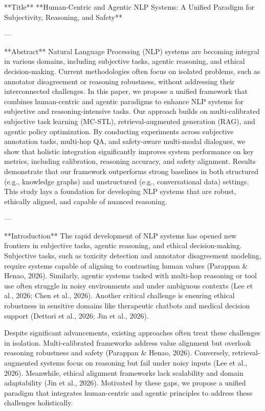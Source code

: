 **Title**  
**Human-Centric and Agentic NLP Systems: A Unified Paradigm for Subjectivity, Reasoning, and Safety**

---

**Abstract**  
Natural Language Processing (NLP) systems are becoming integral in various domains, including subjective tasks, agentic reasoning, and ethical decision-making. Current methodologies often focus on isolated problems, such as annotator disagreement or reasoning robustness, without addressing their interconnected challenges. In this paper, we propose a unified framework that combines human-centric and agentic paradigms to enhance NLP systems for subjective and reasoning-intensive tasks. Our approach builds on multi-calibrated subjective task learning (MC-STL), retrieval-augmented generation (RAG), and agentic policy optimization. By conducting experiments across subjective annotation tasks, multi-hop QA, and safety-aware multi-modal dialogues, we show that holistic integration significantly improves system performance on key metrics, including calibration, reasoning accuracy, and safety alignment. Results demonstrate that our framework outperforms strong baselines in both structured (e.g., knowledge graphs) and unstructured (e.g., conversational data) settings. This study lays a foundation for developing NLP systems that are robust, ethically aligned, and capable of nuanced reasoning.

---

**Introduction**  
The rapid development of NLP systems has opened new frontiers in subjective tasks, agentic reasoning, and ethical decision-making. Subjective tasks, such as toxicity detection and annotator disagreement modeling, require systems capable of aligning to contrasting human values (Parappan & Henao, 2026). Similarly, agentic systems tasked with multi-hop reasoning or tool use often struggle in noisy environments and under ambiguous contexts (Lee et al., 2026; Chen et al., 2026). Another critical challenge is ensuring ethical robustness in sensitive domains like therapeutic chatbots and medical decision support (Dettori et al., 2026; Jin et al., 2026).

Despite significant advancements, existing approaches often treat these challenges in isolation. Multi-calibrated frameworks address value alignment but overlook reasoning robustness and safety (Parappan & Henao, 2026). Conversely, retrieval-augmented systems focus on reasoning but fail under noisy inputs (Lee et al., 2026). Meanwhile, ethical alignment frameworks lack scalability and domain adaptability (Jin et al., 2026). Motivated by these gaps, we propose a unified paradigm that integrates human-centric and agentic principles to address these challenges holistically.

